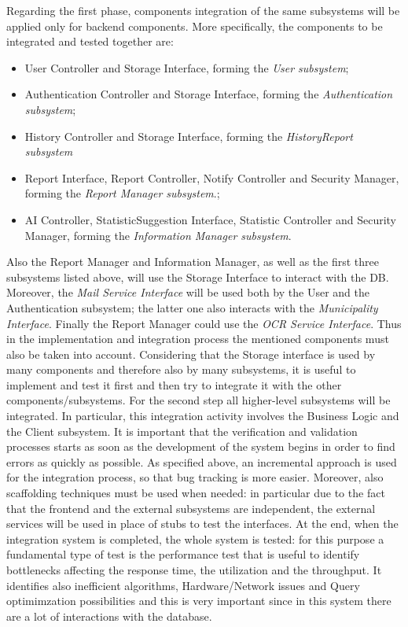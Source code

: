 \documentclass{report}
\begin{document}
\noindent Regarding the first phase, components integration of the same subsystems will be applied only for backend components. More specifically, the components to be integrated and tested together are:
\begin{itemize}
\item User Controller and Storage Interface, forming the \textit{User subsystem};
\item Authentication Controller and Storage Interface, forming the \textit{Authentication subsystem};
\item History Controller and Storage Interface, forming the \textit{HistoryReport subsystem}
\item Report Interface, Report Controller, Notify Controller and Security Manager, forming the \textit{Report Manager subsystem}.;
\item AI Controller, StatisticSuggestion Interface, Statistic Controller and Security Manager, forming the \textit{Information Manager subsystem}.
\end{itemize}
Also the Report Manager and Information Manager, as well as the first three subsystems listed above, will use the Storage Interface to interact with the DB. Moreover, the \textit{Mail Service Interface} will be used both by the User and the Authentication subsystem; the latter one also interacts with the \textit{Municipality Interface}. Finally the Report Manager could use the \textit{OCR Service Interface}. Thus in the implementation and integration process the mentioned components must also be taken into account. 
Considering that the Storage interface is used by many components and therefore also by many subsystems, it is useful to implement and test it first and then try to integrate it with the other components/subsystems. 
\newline
\newline
For the second step all higher-level subsystems will be integrated. In particular, this integration activity involves the Business Logic and the Client subsystem.
\newline
It is important that the verification and validation processes starts as soon as the development of the system begins in order to find errors as quickly as possible. As specified above, an incremental approach is used for the integration process, so that bug tracking is more easier. Moreover, also scaffolding techniques must be used when needed: in particular due to the fact that the frontend and the external subsystems are independent, the external services will be used in place of stubs to test the interfaces.
\newline
At the end, when the integration system is completed, the whole system is tested: for this purpose a fundamental type of test is the performance test that is useful to identify bottlenecks affecting the response time, the utilization and the throughput. It identifies also inefficient algorithms, Hardware/Network issues and Query optimimzation possibilities and this is very important since in this system there are a lot of interactions with the database. 
\end{document}
